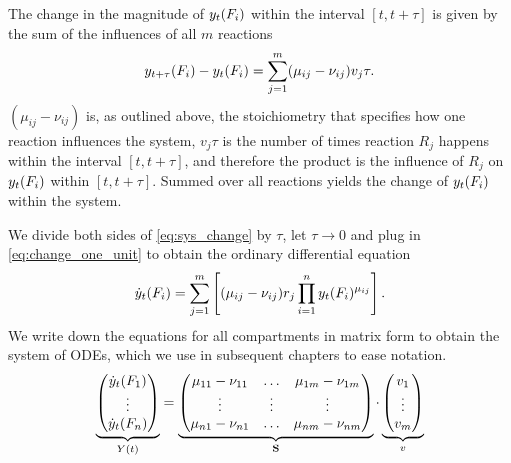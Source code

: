 The change in the magnitude of $y_t(F_i)$ within the interval $[t, t+\tau]$ is given by the sum of the influences of all $m$ reactions
\begin{align}
\label{eq:sys_change}
y_{t+\tau}(F_i) - y_t(F_i) = \sum_{j=1}^m (\mu_{ij} - \nu_{ij}) v_j \tau.
\end{align}
$(\mu_{ij} - \nu_{ij})$ is, as outlined above, the stoichiometry that specifies how one reaction influences the system, $v_j \tau$ is the number of times reaction $R_j$ happens within the interval $[t, t+\tau]$, and therefore the product is the influence of $R_j$ on $y_t(F_i)$ within $[t, t+\tau]$. Summed over all reactions yields the change of $y_t(F_i)$ within the system. 

We divide both sides of \eqref{eq:sys_change} by $\tau$, let $\tau \to 0$ and plug in \eqref{eq:change_one_unit} to obtain the ordinary differential equation
\begin{align}
\dot{y}_t(F_i) = \sum_{j=1}^m \left[(\mu_{ij} - \nu_{ij}) r_j  \prod_{i=1}^n y_t(F_i)^{\mu_{ij}} \right].
\end{align}
We write down the equations for all compartments in matrix form to obtain the system of ODEs, which we use in subsequent chapters to ease notation.
\begin{align}
\label{eq:ode_system_matrix}
\underbrace{\begin{pmatrix}
\dot{y}_t(F_1) \\ \vdots \\ \dot{y}_t(F_n) \end{pmatrix}}_{Y(t)} =
\underbrace{\begin{pmatrix}
\mu_{11} - \nu_{11} & \hdots & \mu_{1m} - \nu_{1m} \\
\vdots & \vdots & \vdots \\
\mu_{n1} - \nu_{n1} & \hdots & \mu_{nm} - \nu_{nm} \\
\end{pmatrix}}_{\mathbf{S}} \cdot
\underbrace{\begin{pmatrix}
v_1 \\ \vdots \\ v_m
\end{pmatrix}}_{v}
\end{align}

